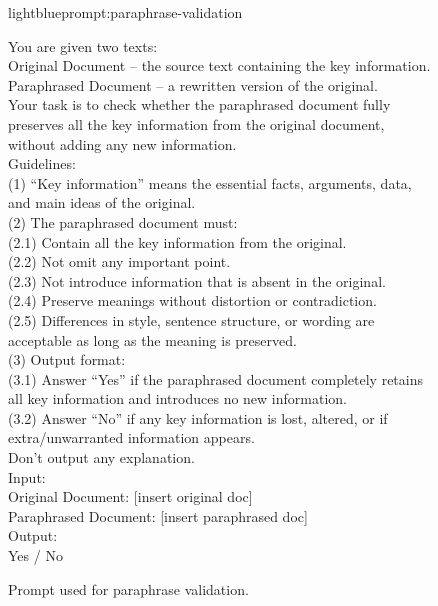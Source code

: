 \documentclass{applemlr}
\numberwithin{equation}{section}
\begin{document}
\begin{figure}[t]
\centering
\begin{minipage}{0.95\textwidth}
\begin{promptbox}[\color{black}{Prompt for Paraphrase Validation}]{lightblue}{prompt:paraphrase-validation}
\label{temp:paraphrase_validation_prompt}

\ttfamily
You are given two texts: \\
Original Document – the source text containing the key information. \\
Paraphrased Document – a rewritten version of the original. \\[4pt]

Your task is to check whether the paraphrased document fully preserves all the key information from the original document, without adding any new information. \\[4pt]

Guidelines: \\[2pt]
(1) ``Key information'' means the essential facts, arguments, data, and main ideas of the original. \\
(2) The paraphrased document must: \\
(2.1) Contain all the key information from the original. \\
(2.2) Not omit any important point. \\
(2.3) Not introduce information that is absent in the original. \\
(2.4) Preserve meanings without distortion or contradiction. \\
(2.5) Differences in style, sentence structure, or wording are acceptable as long as the meaning is preserved. \\[4pt]

(3) Output format: \\
(3.1) Answer ``Yes'' if the paraphrased document completely retains all key information and introduces no new information. \\
(3.2) Answer ``No'' if any key information is lost, altered, or if extra/unwarranted information appears. \\[4pt]

Don't output any explanation. \\[4pt]

Input: \\[2pt]
Original Document: [insert original doc] \\
Paraphrased Document: [insert paraphrased doc] \\[6pt]

Output: \\[2pt]
Yes / No 
\end{promptbox}
\end{minipage}
\caption{Prompt used for paraphrase validation.}
\label{prompt_paraphrase_validation}
\end{figure}
\end{document}
